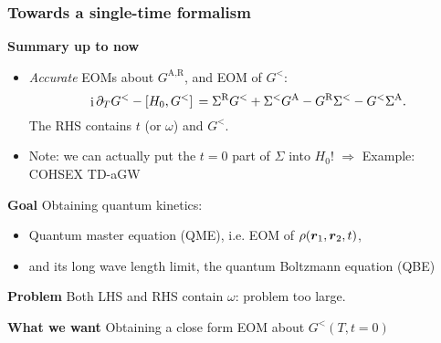 \documentclass[t]{beamer}
\DeclareMathOperator{\ii}{i}
\begin{document}
\begin{frame}
    \frametitle{Towards a single-time formalism}
    
    \textbf{Summary up to now} \begin{itemize}
        \item \emph{Accurate} EOMs about $G^{\text{A}, \text{R}}$, and EOM of $G^<$: 
        \begin{equation}
            \ii \partial_T G^< - \comm*{H_0}{G^<} = 
            \Sigma^{\text{R}} G^< + \Sigma^< G^{\text{A}} - G^{\text{R}} \Sigma^< - G^< \Sigma^{\text{A}}.
        \end{equation}
        The RHS contains $t$ (or $\omega$) and $G^<$.
        \item Note: we can actually put the $t=0$ part of $\Sigma$ into $H_0$!
            $\Rightarrow$ Example: COHSEX TD-aGW
    \end{itemize}

    \vspace{0.25cm}

    \textbf{Goal} Obtaining quantum kinetics: 
    \begin{itemize}
        \item Quantum master equation (QME), i.e. EOM of $\rho(\vb*{r}_1, \vb*{r}_2, t)$,
        \item and its long wave length limit, the quantum Boltzmann equation (QBE)
    \end{itemize} 
    
    \vspace{0.25cm}

    \textbf{Problem} Both LHS and RHS contain $\omega$: problem too large. 

    \textbf{What we want} Obtaining a close form EOM about $G^<(T, t=0)$

\end{frame}
\end{document}
